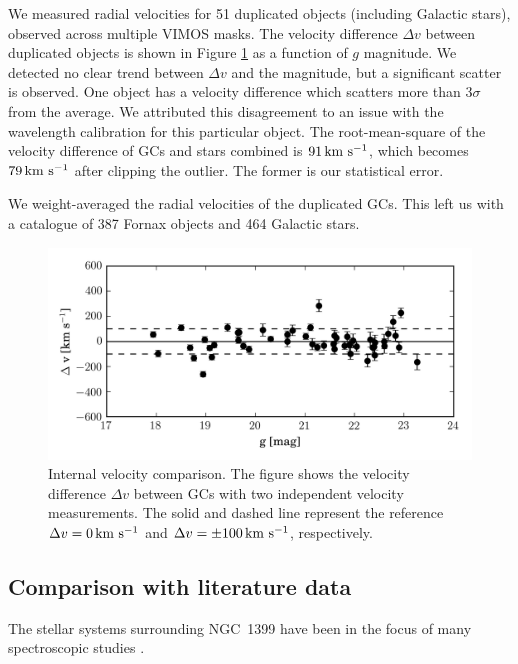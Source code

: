 \documentclass[usenatbib]{mnras}
\newcommand{\kms}{\mbox{\,km~s$^{-1}$}}
\begin{document}
We measured radial velocities for 51 duplicated objects (including Galactic 
stars), observed across multiple VIMOS masks. The velocity difference $\Delta 
v$ between duplicated objects is shown in Figure \ref{fig:internal} as a 
function of $g$ magnitude. We detected no clear trend between $\Delta v$ and 
the magnitude, but a significant scatter is observed. One object has a velocity 
difference which scatters more than 
3$\sigma$ from the average. We attributed this disagreement to an issue with 
the wavelength calibration for this particular object. The root-mean-square of 
the velocity difference of GCs and stars combined is $91 \kms$, which becomes 
$79\kms$ after clipping the outlier. The former is our statistical error.

We weight-averaged the radial velocities of the duplicated GCs. This left us with a catalogue of 387 
Fornax objects and 464 Galactic stars.

\begin{figure}
\centering
\includegraphics[width=\columnwidth]{figures/internal.png} 
\caption{Internal velocity comparison. The figure shows the velocity difference 
$\Delta v$ between GCs with two independent velocity measurements. The solid 
and dashed line represent the reference $\Delta v = 0 \kms$ and 
$\Delta v = \pm 100 \kms$, respectively. }
\label{fig:internal}
\end{figure}

\subsection{Comparison with literature data}\label{sec:compar}

The stellar systems surrounding NGC~1399 have been in the focus of many 
spectroscopic studies
\citep{Dirsch04, Schuberth, Bergond07, Firth07, Chilingarian11, Mieske04, 
Hilker07, Francis12, Drinkwater00}.
\end{document}
